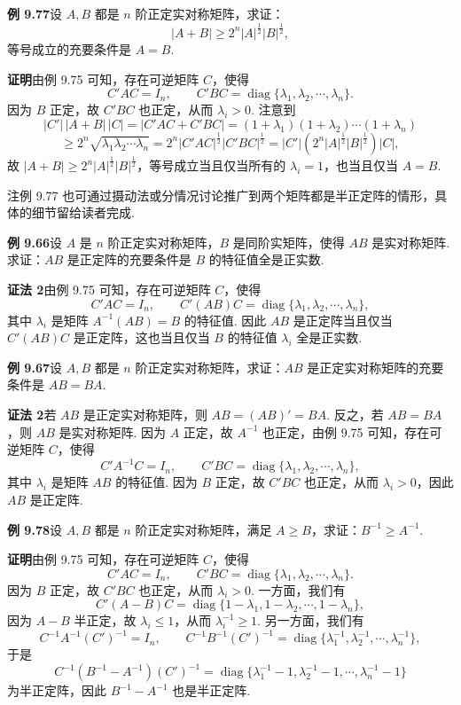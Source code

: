 \documentclass[UTF8, 12pt, fontset=fandol, oneside]{ctexart}
\begin{document}
\noindent\textbf{例 9.77}\quad 设 $A,B$ 都是 $n$ 阶正定实对称矩阵，求证：
\[
|A+B|\ge2^n|A|^{\frac12}|B|^{\frac12},
\]
等号成立的充要条件是 $A=B$.

\noindent\textbf{证明}\quad 由例 9.75 可知，存在可逆矩阵 $C$，使得
\[
C'AC=I_n,\qquad C'BC=\operatorname{diag}\{\lambda_1,\lambda_2,\cdots,\lambda_n\}.
\]
因为 $B$ 正定，故 $C'BC$ 也正定，从而 $\lambda_i>0$. 注意到
\[
|C'|\,|A+B|\,|C|=|C'AC+C'BC|=(1+\lambda_1)(1+\lambda_2)\cdots(1+\lambda_n)
\]
\[
\ge2^n\sqrt{\lambda_1\lambda_2\cdots\lambda_n}
=2^n|C'AC|^{\frac12}|C'BC|^{\frac12}
=|C'|(2^n|A|^{\frac12}|B|^{\frac12})|C|,
\]
故 $|A+B|\ge2^n|A|^{\frac12}|B|^{\frac12}$，等号成立当且仅当所有的 $\lambda_i=1$，也当且仅当 $A=B$.

注\quad 例 9.77 也可通过摄动法或分情况讨论推广到两个矩阵都是半正定阵的情形，具体的细节留给读者完成.

\noindent\textbf{例 9.66}\quad 设 $A$ 是 $n$ 阶正定实对称矩阵，$B$ 是同阶实矩阵，使得 $AB$ 是实对称矩阵. 求证：$AB$ 是正定阵的充要条件是 $B$ 的特征值全是正实数.

\noindent\textbf{证法 2}\quad 由例 9.75 可知，存在可逆矩阵 $C$，使得
\[
C'AC=I_n,\qquad C'(AB)C=\operatorname{diag}\{\lambda_1,\lambda_2,\cdots,\lambda_n\},
\]
其中 $\lambda_i$ 是矩阵 $A^{-1}(AB)=B$ 的特征值. 因此 $AB$ 是正定阵当且仅当 $C'(AB)C$ 是正定阵，这也当且仅当 $B$ 的特征值 $\lambda_i$ 全是正实数.

\noindent\textbf{例 9.67}\quad 设 $A,B$ 都是 $n$ 阶正定实对称矩阵，求证：$AB$ 是正定实对称矩阵的充要条件是 $AB=BA$.

\noindent\textbf{证法 2}\quad 若 $AB$ 是正定实对称矩阵，则 $AB=(AB)'=BA$. 反之，若 $AB=BA$，则 $AB$ 是实对称矩阵. 因为 $A$ 正定，故 $A^{-1}$ 也正定，由例 9.75 可知，存在可逆矩阵 $C$，使得
\[
C'A^{-1}C=I_n,\qquad C'BC=\operatorname{diag}\{\lambda_1,\lambda_2,\cdots,\lambda_n\},
\]
其中 $\lambda_i$ 是矩阵 $AB$ 的特征值. 因为 $B$ 正定，故 $C'BC$ 也正定，从而 $\lambda_i>0$，因此 $AB$ 是正定阵.

\noindent\textbf{例 9.78}\quad 设 $A,B$ 都是 $n$ 阶正定实对称矩阵，满足 $A\ge B$，求证：$B^{-1}\ge A^{-1}$.

\noindent\textbf{证明}\quad 由例 9.75 可知，存在可逆矩阵 $C$，使得
\[
C'AC=I_n,\qquad C'BC=\operatorname{diag}\{\lambda_1,\lambda_2,\cdots,\lambda_n\}.
\]
因为 $B$ 正定，故 $C'BC$ 也正定，从而 $\lambda_i>0$. 一方面，我们有
\[
C'(A-B)C=\operatorname{diag}\{1-\lambda_1,1-\lambda_2,\cdots,1-\lambda_n\},
\]
因为 $A-B$ 半正定，故 $\lambda_i\le1$，从而 $\lambda_i^{-1}\ge1$. 另一方面，我们有
\[
C^{-1}A^{-1}(C')^{-1}=I_n,\qquad
C^{-1}B^{-1}(C')^{-1}=\operatorname{diag}\{\lambda_1^{-1},\lambda_2^{-1},\cdots,\lambda_n^{-1}\},
\]
于是
\[
C^{-1}(B^{-1}-A^{-1})(C')^{-1}
=\operatorname{diag}\{\lambda_1^{-1}-1,\lambda_2^{-1}-1,\cdots,\lambda_n^{-1}-1\}
\]
为半正定阵，因此 $B^{-1}-A^{-1}$ 也是半正定阵.
\end{document}
